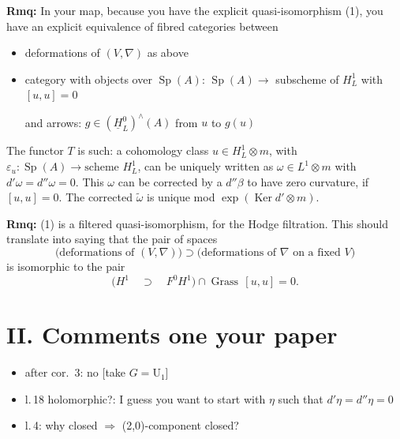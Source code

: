 \documentclass[11pt,a4paper]{article}
\DeclareMathOperator{\Sp}{Sp}
\DeclareMathOperator{\Ker}{Ker}
\DeclareMathOperator{\Grass}{Grass}
\begin{document}
\newpage

\noindent\textbf{Rmq:} In your map, because you have the explicit quasi-isomorphism (1), you have an explicit equivalence of fibred categories between
\begin{itemize}[leftmargin=2cm]
\item[$*$] deformations of $(V,\nabla)$ as above
\item[$*$] category with objects over $\Sp(A)$: $\Sp(A) \longrightarrow$ subscheme of $H^1_L$ with $[u,u]=0$

and arrows: $g \in (\underline{H}^0_L)^\wedge(A)$ from $u$ to $g(u)$
\end{itemize}

\vspace{0.3cm}

The functor $T$ is such: a cohomology class $u \in H^1_L \otimes m$, with $\varepsilon_u\colon \Sp(A) \to \text{scheme } H^1_L$, can be uniquely written as $\omega \in L^1 \otimes m$ with $d'\omega = d''\omega = 0$. This $\omega$ can be corrected by a $d''\beta$ to have zero curvature, if $[u,u]=0$. The corrected $\tilde{\omega}$ is unique mod $\exp(\Ker d' \otimes m)$.

\vspace{0.3cm}

\noindent\textbf{Rmq:} (1) is a filtered quasi-isomorphism, for the Hodge filtration. This should translate into saying that the pair of spaces
\[
\bigl(\text{deformations of }(V,\nabla)\bigr) \supset \bigl(\text{deformations of }\nabla\text{ on a fixed }V\bigr)
\]
is isomorphic to the pair
\[
\bigl(H^1 \quad\supset\quad F^0 H^1\bigr) \cap \Grass\,[u,u]=0.
\]

\newpage

\section*{II. Comments one your paper}

\begin{itemize}[leftmargin=0.5cm]
\item[$p\,2$] after cor.\ 3: no [take $G = \mathrm{U}_1$]
\item[$p\,6$] l.\,18 holomorphic?: I guess you want to start with $\eta$ such that $d'\eta = d''\eta = 0$
\item[$p\,7$] l.\,4: why closed $\Rightarrow$ (2,0)-component closed?
\end{itemize}

\vspace{0.5cm}
\end{document}
